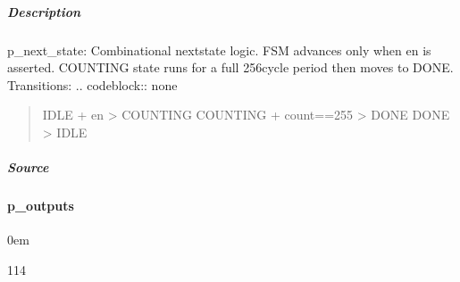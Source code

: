 \documentclass[letterpaper,10pt,english]{sphinxmanual}
\begin{document}
\subparagraph{Description}
\label{\detokenize{modules/pwm_controller/processes/p_next_state:description}}
\sphinxAtStartPar
p\_next\_state: Combinational next\sphinxhyphen{}state logic.
FSM advances only when en is asserted.
COUNTING state runs for a full 256\sphinxhyphen{}cycle period then moves to DONE.
Transitions:
.. code\sphinxhyphen{}block:: none
\begin{quote}

\sphinxAtStartPar
IDLE     + en           \sphinxhyphen{}\textgreater{} COUNTING
COUNTING + count==255   \sphinxhyphen{}\textgreater{} DONE
DONE                    \sphinxhyphen{}\textgreater{} IDLE
\end{quote}

\noindent{}


\subparagraph{Source}
\label{\detokenize{modules/pwm_controller/processes/p_next_state:source}}
\begin{sphinxVerbatim}[commandchars=\\\{\}]
\end{sphinxVerbatim}

\sphinxstepscope


\paragraph{p\_outputs}
\label{\detokenize{modules/pwm_controller/processes/p_outputs:p-outputs}}\label{\detokenize{modules/pwm_controller/processes/p_outputs::doc}}
\begin{DUlineblock}{0em}
\item[]  
\item[]  114
\item[]  
\item[]  \sphinxcode{\sphinxupquote{*}}
\end{DUlineblock}
\end{document}
